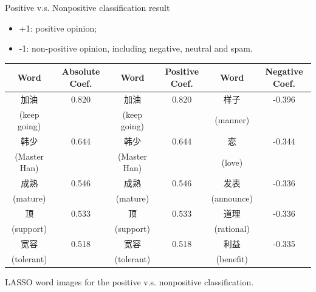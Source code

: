 \documentclass[12pt, trans]{beamer}
\newcommand{\1}[1]{{\mathbf 1}\left\{#1\right\}}        %
\begin{document}
\begin{frame}{Positive v.s. Nonpositive classification result}

\begin{itemize}[<+->]
\item +1: positive opinion;
\item -1: non-positive opinion, including negative, neutral and spam.
\end{itemize}

\tiny
\begin{center}
\begin{tabular}{|c|c||c|c||c|c|}
\hline
Word & Absolute Coef. & Word & Positive Coef. & Word & Negative Coef.\\ \hline \hline
加油 & 0.820 & 加油 & 0.820 & 样子 & -0.396\\
(keep going) & & (keep going) & & (manner) & \\\hline
韩少 & 0.644 & 韩少 & 0.644 & 恋 & -0.344\\
(Master Han) & & (Master Han) & & (love) & \\\hline
成熟 & 0.546 & 成熟 & 0.546 & 发表 & -0.336\\
(mature) & & (mature) & & (announce) & \\\hline
顶 & 0.533 & 顶 & 0.533 & 道理 & -0.336\\
(support) & & (support) & & (rational) & \\\hline
宽容 & 0.518 & 宽容 & 0.518 & 利益 & -0.335\\
(tolerant) & & (tolerant) & & (benefit) & \\\hline
\end{tabular}
LASSO word images for the positive v.s. nonpositive classification.
\end{center}


\end{frame}
\end{document}
